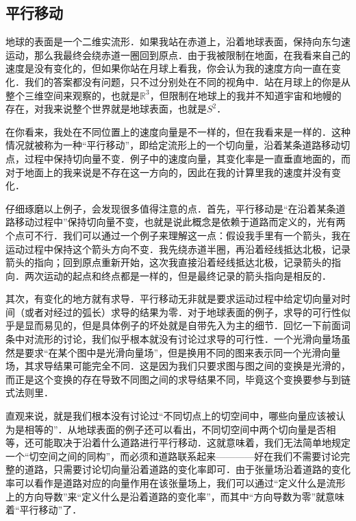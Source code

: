 

\subsection{平行移动}

地球的表面是一个二维实流形．如果我站在赤道上，沿着地球表面，保持向东匀速运动，那么我最终会绕赤道一圈回到原点．由于我被限制在地面，在我看来自己的速度是没有变化的，但如果你站在月球上看我，你会认为我的速度方向一直在变化．我们的答案都没有问题，只不过分别处在不同的视角中．站在月球上的你是从整个三维空间来观察的，也就是$\mathbb{R}^3$，但限制在地球上的我并不知道宇宙和地幔的存在，对我来说整个世界就是地球表面，也就是$S^2$．

在你看来，我处在不同位置上的速度向量是不一样的，但在我看来是一样的．这种情况就被称为一种“平行移动”，即给定流形上的一个切向量，沿着某条道路移动切点，过程中保持切向量不变．例子中的速度向量，其变化率是一直垂直地面的，而对于地面上的我来说是不存在这一方向的，因此在我的计算里我的速度并没有变化．

仔细琢磨以上例子，会发现很多值得注意的点．首先，平行移动是“在沿着某条道路移动过程中”保持切向量不变，也就是说此概念是依赖于道路而定义的，光有两个点可不行．我们可以通过一个例子来理解这一点：假设我手里有一个箭头，我在运动过程中保持这个箭头方向不变．我先绕赤道半圈，再沿着经线抵达北极，记录箭头的指向；回到原点重新开始，这次我直接沿着经线抵达北极，记录箭头的指向．两次运动的起点和终点都是一样的，但是最终记录的箭头指向是相反的．

其次，有变化的地方就有求导．平行移动无非就是要求运动过程中给定切向量对时间（或者对经过的弧长）求导的结果为零．对于地球表面的例子，求导的可行性似乎是显而易见的，但是具体例子的坏处就是自带先入为主的细节．回忆一下前面词条中对流形的讨论，我们似乎根本就没有讨论过求导的可行性．一个光滑向量场虽然是要求“在某个图中是光滑向量场”，但是换用不同的图来表示同一个光滑向量场，其求导结果可能完全不同．这是因为我们只要求图与图之间的变换是光滑的，而正是这个变换的存在导致不同图之间的求导结果不同，毕竟这个变换要参与到链式法则里．

直观来说，就是我们根本没有讨论过“不同切点上的切空间中，哪些向量应该被认为是相等的”．从地球表面的例子还可以看出，不同切空间中两个切向量是否相等，还可能取决于沿着什么道路进行平行移动．这就意味着，我们无法简单地规定一个“切空间之间的同构”，而必须和道路联系起来————好在我们不需要讨论完整的道路，只需要讨论切向量沿着道路的变化率即可．由于张量场沿着道路的变化率可以看作是道路对应的向量作用在该张量场上，我们可以通过“定义什么是流形上的方向导数”来“定义什么是沿着道路的变化率”，而其中“方向导数为零”就意味着“平行移动”了．

